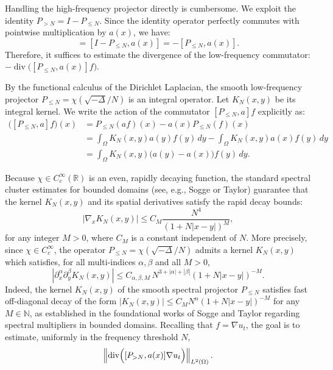 \documentclass[11pt,letterpaper]{amsart}
\begin{document}
Handling the high-frequency projector directly is cumbersome. We exploit the identity $P_{>N} = I - P_{\le N}$. Since the identity operator perfectly commutes with pointwise multiplication by $a(x)$, we have:
\begin{equation*}
    [P_{>N}, a(x)] = [I - P_{\le N}, a(x)] = - [P_{\le N}, a(x)].
\end{equation*}
Therefore, it suffices to estimate the divergence of the low-frequency commutator: $- \operatorname{div} \big( [P_{\le N}, a(x)] f \big)$.

By the functional calculus of the Dirichlet Laplacian, the smooth low-frequency projector $P_{\le N} = \chi(\sqrt{-\Delta}/N)$ is an integral operator. Let $K_N(x,y)$ be its integral kernel. We write the action of the commutator $[P_{\le N}, a] f$ explicitly as:
\begin{align*}
    \big([P_{\le N}, a] f\big)(x) &= P_{\le N}(a f)(x) - a(x) P_{\le N}(f)(x) \\
    &= \int_{\Omega} K_N(x,y) a(y) f(y) \, dy - \int_{\Omega} K_N(x,y) a(x) f(y) \, dy \\
    &= \int_{\Omega} K_N(x,y) \Big( a(y) - a(x) \Big) f(y) \, dy.
\end{align*}

Because $\chi \in C_c^\infty(\mathbb{R})$ is an even, rapidly decaying function, the standard spectral cluster estimates for bounded domains (see, e.g., Sogge or Taylor) guarantee that the kernel $K_N(x,y)$ and its spatial derivatives satisfy the rapid decay bounds:
\begin{equation}\label{eq:kernel_bounds}
    |\nabla_x K_N(x,y)| \le C_M \frac{N^4}{(1 + N|x-y|)^M},
\end{equation}
for any integer $M > 0$, where $C_M$ is a constant independent of $N$. More precisely, since $\chi \in C_c^\infty$, the operator
$P_{\le N} = \chi(\sqrt{-\Delta}/N)$ admits a kernel $K_N(x,y)$
which satisfies, for all multi-indices $\alpha,\beta$ and all $M>0$,
\[
|\partial_x^\alpha \partial_y^\beta K_N(x,y)|
\le C_{\alpha,\beta,M}\, N^{3+|\alpha|+|\beta|}
(1+N|x-y|)^{-M}.
\]
Indeed, the kernel $K_N(x, y)$ of the smooth spectral projector $P_{\le N}$ satisfies fast off-diagonal decay of the form $|K_N(x, y)| \le C_M N^n (1 + N|x - y|)^{-M}$ for any $M \in \mathbb{N}$, as established in the foundational works of Sogge \cite{Sogge} and Taylor \cite{Taylor} regarding spectral multipliers in bounded domains.  Recalling that $f = \nabla u_t$, the goal is to estimate, uniformly in the frequency threshold $N$,
\[
\left\| \hbox{div}\Big( [P_{>N}, a(x)] \nabla u_t \Big) \right\|_{L^2(\Omega)}.
\]
\end{document}
